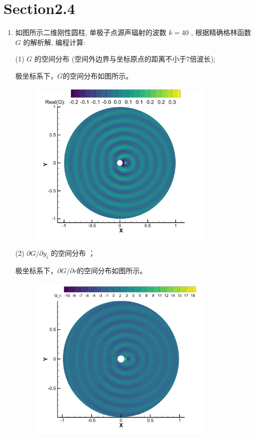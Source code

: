 \section*{Section2.4}

\begin{enumerate}
    \item 如图所示二维刚性圆柱, 
    单极子点源声辐射的波数 \(k=40\)  , 
    根据精确格林函数  \(G \) 的解析解, 编程计算:
    
    (1) \(G\) 的空间分布 (空间外边界与坐标原点的距离不小于7倍波长);

    极坐标系下，\(G\)的空间分布如图所示。
    \begin{figure}[htbp]
        \centering
        \includegraphics[height=8cm]{image/G.png}
    \end{figure}
    

    (2) \(\partial G / \partial y_{i}\) 的空间分布 ；

    极坐标系下，\(\partial G / \partial r\)的空间分布如图所示。
    \begin{figure}[htbp]
        \centering
        \includegraphics[height=8cm]{image/G_r.png}
    \end{figure}
    

\end{enumerate}
